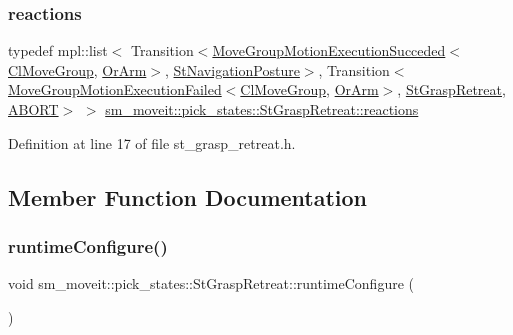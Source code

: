 \subsubsection{\texorpdfstring{reactions}{reactions}}
{\footnotesize\ttfamily typedef mpl\+::list$<$ Transition$<$\hyperlink{structmoveit__z__client_1_1MoveGroupMotionExecutionSucceded}{Move\+Group\+Motion\+Execution\+Succeded}$<$\hyperlink{classmoveit__z__client_1_1ClMoveGroup}{Cl\+Move\+Group}, \hyperlink{classsm__moveit_1_1OrArm}{Or\+Arm}$>$, \hyperlink{structsm__moveit_1_1pick__states_1_1StNavigationPosture}{St\+Navigation\+Posture}$>$, Transition$<$\hyperlink{structmoveit__z__client_1_1MoveGroupMotionExecutionFailed}{Move\+Group\+Motion\+Execution\+Failed}$<$\hyperlink{classmoveit__z__client_1_1ClMoveGroup}{Cl\+Move\+Group}, \hyperlink{classsm__moveit_1_1OrArm}{Or\+Arm}$>$, \hyperlink{structsm__moveit_1_1pick__states_1_1StGraspRetreat}{St\+Grasp\+Retreat}, \hyperlink{classABORT}{A\+B\+O\+RT}$>$ $>$ \hyperlink{structsm__moveit_1_1pick__states_1_1StGraspRetreat_a8cb7952472046718830fb75585f0d11a}{sm\+\_\+moveit\+::pick\+\_\+states\+::\+St\+Grasp\+Retreat\+::reactions}}



Definition at line 17 of file st\+\_\+grasp\+\_\+retreat.\+h.



\subsection{Member Function Documentation}
\mbox{\label{structsm__moveit_1_1pick__states_1_1StGraspRetreat_a1a712867a1888f96a82f19d6ccfb2a76}} 
\subsubsection{\texorpdfstring{runtime\+Configure()}{runtimeConfigure()}}
{\footnotesize\ttfamily void sm\+\_\+moveit\+::pick\+\_\+states\+::\+St\+Grasp\+Retreat\+::runtime\+Configure (\begin{DoxyParamCaption}{ }\end{DoxyParamCaption})\hspace{0.3cm}{\ttfamily [inline]}}



